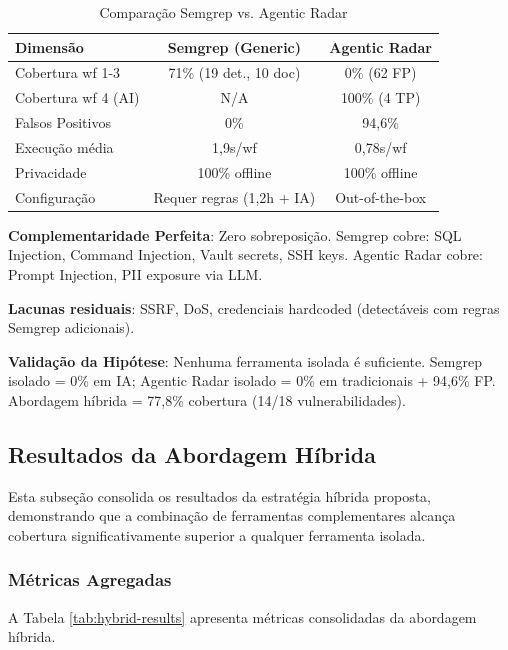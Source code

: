\documentclass[12pt,a4paper]{article}
\begin{document}
\begin{table}[H]
\centering
\caption{Comparação Semgrep vs. Agentic Radar}
\label{tab:comparative-coverage}
\small
\begin{tabular}{@{}lcc@{}}
\toprule
\textbf{Dimensão} & \textbf{Semgrep (Generic)} & \textbf{Agentic Radar} \\ \midrule
Cobertura wf 1-3 & 71\% (19 det., 10 doc) & 0\% (62 FP) \\
Cobertura wf 4 (AI) & N/A & 100\% (4 TP) \\
Falsos Positivos & 0\% & 94,6\% \\
Execução média & 1,9s/wf & 0,78s/wf \\
Privacidade & 100\% offline & 100\% offline \\
Configuração & Requer regras (1,2h + IA) & Out-of-the-box \\
\bottomrule
\end{tabular}
\end{table}

\textbf{Complementaridade Perfeita}: Zero sobreposição. Semgrep cobre: SQL Injection, Command Injection, Vault secrets, SSH keys. Agentic Radar cobre: Prompt Injection, PII exposure via LLM.

\textbf{Lacunas residuais}: SSRF, DoS, credenciais hardcoded (detectáveis com regras Semgrep adicionais).

\textbf{Validação da Hipótese}: Nenhuma ferramenta isolada é suficiente. Semgrep isolado = 0\% em IA; Agentic Radar isolado = 0\% em tradicionais + 94,6\% FP. Abordagem híbrida = 77,8\% cobertura (14/18 vulnerabilidades).

\subsection{Resultados da Abordagem Híbrida}

Esta subseção consolida os resultados da estratégia híbrida proposta, demonstrando que a combinação de ferramentas complementares alcança cobertura significativamente superior a qualquer ferramenta isolada.

\subsubsection{Métricas Agregadas}

A Tabela \ref{tab:hybrid-results} apresenta métricas consolidadas da abordagem híbrida.
\end{document}
